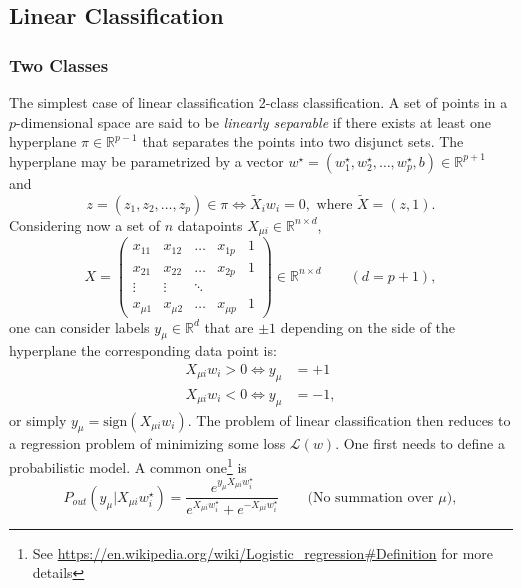 \documentclass{article}
\begin{document}
\subsection{Linear Classification}
\subsubsection*{Two Classes}
The simplest case of linear classification 2-class classification. A set of points in a $p$-dimensional space are said to be \emph{linearly separable} if there exists at least one hyperplane $\pi \in \mathbb{R}^{p-1}$ that separates the points into two disjunct sets. The hyperplane may be parametrized by a vector $w^{\star} = (w_1^{\star} , w_2^{\star} , \dots , w_p^{\star}, b) \in \mathbb{R}^{p+1}$ and
\begin{equation}
    z = (z_1 , z_2 , \dots , z_p)
    \in \pi \iff \tilde{X}_i w_i = 0, \text{ where }
    \tilde{X} = (z,1).
\end{equation}
Considering now a set of $n$ datapoints $X_{\mu i} \in \mathbb{R}^{n \times d}$,
\begin{equation}
    X =
    \begin{pmatrix}
        x_{1 1} & x_{1 2} & \dots & x_{1 p} & 1 \\
        x_{2 1} & x_{2 2} & \dots & x_{2 p} & 1 \\
        \vdots & \vdots & \ddots & \\
        x_{\mu 1} & x_{\mu 2} & \dots & x_{\mu p} & 1
    \end{pmatrix}
    \in \mathbb{R}^{n\times d} \quad \quad (d=p+1),
\end{equation}
one can consider labels $y_{\mu}\in \mathbb{R}^{d}$ that are $\pm 1$ depending on the side of the hyperplane the corresponding data point is:
\begin{align*}
    X_{\mu i} w_i > 0 \iff y_{\mu} &= +1 \\
    X_{\mu i} w_i < 0 \iff y_{\mu} &= -1,
\end{align*}
or simply $y_{\mu} = \text{sign}(X_{\mu i} w_i)$. The problem of linear classification then reduces to a regression problem of minimizing some loss $\mathcal{L}(w)$. One first needs to define a probabilistic model. A common one\footnote{See \url{https://en.wikipedia.org/wiki/Logistic_regression\#Definition} for more details} is
\begin{equation}
    P_{out} (y_{\mu} | X_{\mu i} w^{\star}_i)
    =
    \frac{e^{y_{\mu} X_{\mu i} w^{\star}_i}}{e^{X_{\mu i} w^{\star}_i} + e^{-X_{\mu i} w^{\star}_i}}
    \quad\quad \text{(No summation over $\mu$)},
    \label{eq:logisticlikelihood}
\end{equation}
\end{document}

